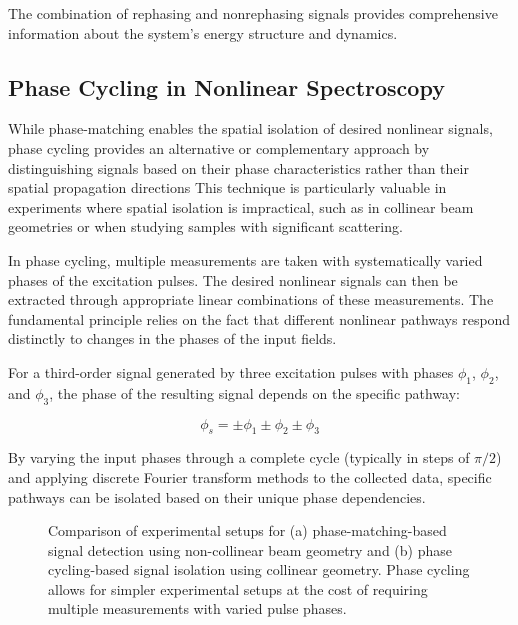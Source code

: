 \noindent The combination of rephasing and nonrephasing signals provides comprehensive information about the system's energy structure and dynamics.

\subsection{Phase Cycling in Nonlinear Spectroscopy}
\label{subsec:phase_cycling}

\noindent While phase-matching enables the spatial isolation of desired nonlinear signals, phase cycling provides an alternative or complementary approach by distinguishing signals based on their phase characteristics rather than their spatial propagation directions %
This technique is particularly valuable in experiments where spatial isolation is impractical, such as in collinear beam geometries or when studying samples with significant scattering.

\noindent In phase cycling, multiple measurements are taken with systematically varied phases of the excitation pulses. The desired nonlinear signals can then be extracted through appropriate linear combinations of these measurements. The fundamental principle relies on the fact that different nonlinear pathways respond distinctly to changes in the phases of the input fields.

\noindent For a third-order signal generated by three excitation pulses with phases $\phi_1$, $\phi_2$, and $\phi_3$, the phase of the resulting signal depends on the specific pathway:

\begin{equation}
	\phi_s = \pm\phi_1 \pm\phi_2 \pm\phi_3
	\label{eq:phase_cycling}
\end{equation}

\noindent By varying the input phases through a complete cycle (typically in steps of $\pi/2$) and applying discrete Fourier transform methods to the collected data, specific pathways can be isolated based on their unique phase dependencies.

\begin{figure}[ht]
	\centering
	\caption{Comparison of experimental setups for (a) phase-matching-based signal detection using non-collinear beam geometry and (b) phase cycling-based signal isolation using collinear geometry. Phase cycling allows for simpler experimental setups at the cost of requiring multiple measurements with varied pulse phases.}
	\label{fig:phase_cycling_vs_matching}
\end{figure}

